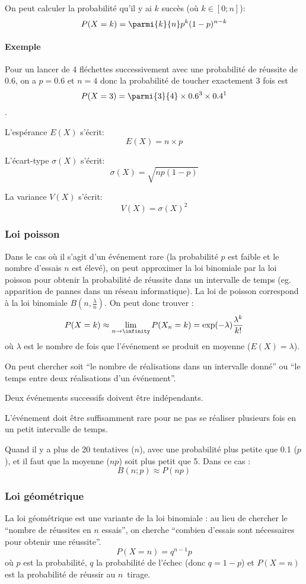 \documentclass[10pt,a4paper,french]{article}
\begin{document}
On peut calculer la probabilité qu'il y ai $k$ succès (où $k \in [0; n]$):
\[
P(X=k) = \parmi{k}{n} p^k (1-p)^{n-k}
\]

\paragraph{Exemple}
Pour un lancer de 4 fléchettes successivement avec une probabilité de réussite de $0.6$, on a $p=0.6$ et $n=4$ donc la probabilité de toucher exactement 3 fois est \[ P(X=3) = \parmi{3}{4} \times 0.6^3 \times 0.4^1 \].

L'espérance $E(X)$ s'écrit: \[E(X)=n \times p\]

L'écart-type $\sigma(X)$ s'écrit: \[\sigma(X)=\sqrt{np(1-p)}\]

La variance $V(X)$ s'écrit: \[V(X) = \sigma(X)^2\]

\subsubsection{Loi poisson}
Dans le cas où il s'agit d'un événement rare (la probabilité $p$ est faible et le nombre d'essais $n$ est élevé), on peut approximer la loi binomiale par la loi poisson pour obtenir la probabilité de réussite dans un intervalle de temps (eg. apparition de pannes dans un réseau informatique). La loi de poisson correspond à la loi binomiale $B(n, \frac{\lambda}{n})$. On peut donc trouver :
\[
P(X = k) \approx \lim_{n \to \infinity} P(X_n = k) = \exp(-\lambda) \frac{\lambda^k}{k!}
\] où $\lambda$ est le nombre de fois que l'événement se produit en moyenne ($E(X) = \lambda$).

On peut chercher soit ``le nombre de réalisations dans un intervalle donné'' ou ``le temps entre deux réalisations d'un événement''.

Deux événements successifs doivent être indépendants.

L'événement doit être suffisamment rare pour ne pas se réaliser plusieurs fois en un petit intervalle de temps.

Quand il y a plus de 20 tentatives ($n$), avec une probabilité plus petite que 0.1 ($p$), et il faut que la moyenne ($np$) soit plus petit que 5. Dans ce cas : \[B(n; p) \approx P(np)\]

\subsubsection{Loi géométrique}

La loi géométrique est une variante de la loi binomiale : au lieu de chercher le ``nombre de réussites en $n$ essais'', on cherche ``combien d'essais sont nécessaires pour obtenir une réussite''.
\[
P(X = n) = q^{n-1} p
\] où $p$ est la probabilité, $q$ la probabilité de l'échec (donc $q = 1-p$) et $P(X = n)$ est la probabilité de réussir au $n$\ieme~tirage.
\end{document}
